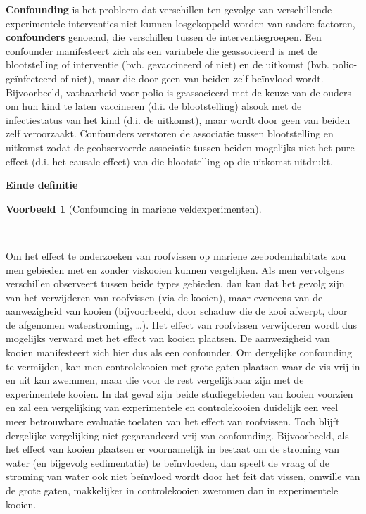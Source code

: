 \documentclass[
  dutch,
  letterpaper,
  12pt]{book}
\theoremstyle{definition}
\theoremstyle{definition}
\theoremstyle{definition}
\newtheorem{example}{Voorbeeld}[chapter]
\theoremstyle{remark}
\begin{document}
\textbf{Confounding} is het probleem dat verschillen ten gevolge van
verschillende experimentele interventies niet kunnen losgekoppeld worden
van andere factoren, \textbf{confounders} genoemd, die verschillen
tussen de interventiegroepen. Een confounder manifesteert zich als een
variabele die geassocieerd is met de blootstelling of interventie (bvb.
gevaccineerd of niet) en de uitkomst (bvb. polio-geïnfecteerd of niet),
maar die door geen van beiden zelf beïnvloed wordt. Bijvoorbeeld,
vatbaarheid voor polio is geassocieerd met de keuze van de ouders om hun
kind te laten vaccineren (d.i. de blootstelling) alsook met de
infectiestatus van het kind (d.i. de uitkomst), maar wordt door geen van
beiden zelf veroorzaakt. Confounders verstoren de associatie tussen
blootstelling en uitkomst zodat de geobserveerde associatie tussen
beiden mogelijks niet het pure effect (d.i. het causale effect) van die
blootstelling op die uitkomst uitdrukt.

\textbf{Einde definitie}

\begin{example}[Confounding in mariene
veldexperimenten]\protect\hypertarget{exm-confounding-in-mariene-veldexperimenten}{}\label{exm-confounding-in-mariene-veldexperimenten}

~

\end{example}

Om het effect te onderzoeken van roofvissen op mariene zeebodemhabitats
zou men gebieden met en zonder viskooien kunnen vergelijken. Als men
vervolgens verschillen observeert tussen beide types gebieden, dan kan
dat het gevolg zijn van het verwijderen van roofvissen (via de kooien),
maar eveneens van de aanwezigheid van kooien (bijvoorbeeld, door schaduw
die de kooi afwerpt, door de afgenomen waterstroming, \ldots). Het
effect van roofvissen verwijderen wordt dus mogelijks verward met het
effect van kooien plaatsen. De aanwezigheid van kooien manifesteert zich
hier dus als een confounder. Om dergelijke confounding te vermijden, kan
men controlekooien met grote gaten plaatsen waar de vis vrij in en uit
kan zwemmen, maar die voor de rest vergelijkbaar zijn met de
experimentele kooien. In dat geval zijn beide studiegebieden van kooien
voorzien en zal een vergelijking van experimentele en controlekooien
duidelijk een veel meer betrouwbare evaluatie toelaten van het effect
van roofvissen. Toch blijft dergelijke vergelijking niet gegarandeerd
vrij van confounding. Bijvoorbeeld, als het effect van kooien plaatsen
er voornamelijk in bestaat om de stroming van water (en bijgevolg
sedimentatie) te beïnvloeden, dan speelt de vraag of de stroming van
water ook niet beïnvloed wordt door het feit dat vissen, omwille van de
grote gaten, makkelijker in controlekooien zwemmen dan in experimentele
kooien.
\end{document}
